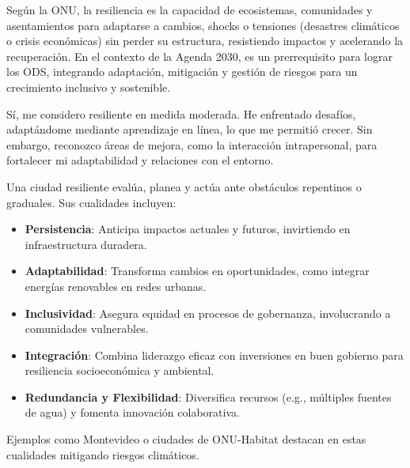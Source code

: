 Según la ONU, la resiliencia es la capacidad de ecosistemas, comunidades y asentamientos para adaptarse 
a cambios, shocks o tensiones (desastres climáticos o crisis económicas) sin perder su estructura,
resistiendo impactos y acelerando la recuperación. En el contexto de la Agenda 2030, es un prerrequisito para lograr 
los ODS, integrando adaptación, mitigación y gestión de riesgos para un crecimiento inclusivo y sostenible.

Sí, me considero resiliente en medida moderada. He enfrentado desafíos, adaptándome mediante aprendizaje en línea,
lo que me permitió crecer. Sin embargo, reconozco áreas de mejora, como la interacción intrapersonal, para fortalecer 
mi adaptabilidad y relaciones con el entorno. 

Una ciudad resiliente evalúa, planea y actúa ante obstáculos repentinos o graduales. Sus cualidades incluyen:
\begin{itemize}
\item \textbf{Persistencia}: Anticipa impactos actuales y futuros, invirtiendo en infraestructura duradera.
\item \textbf{Adaptabilidad}: Transforma cambios en oportunidades, como integrar energías renovables en redes urbanas.
\item \textbf{Inclusividad}: Asegura equidad en procesos de gobernanza, involucrando a comunidades vulnerables.
\item \textbf{Integración}: Combina liderazgo eficaz con inversiones en buen gobierno para resiliencia socioeconómica y ambiental.
\item \textbf{Redundancia y Flexibilidad}: Diversifica recursos (e.g., múltiples fuentes de agua) y fomenta innovación colaborativa. 
\end{itemize}
Ejemplos como Montevideo o ciudades de ONU-Habitat destacan en estas cualidades mitigando riesgos climáticos.





